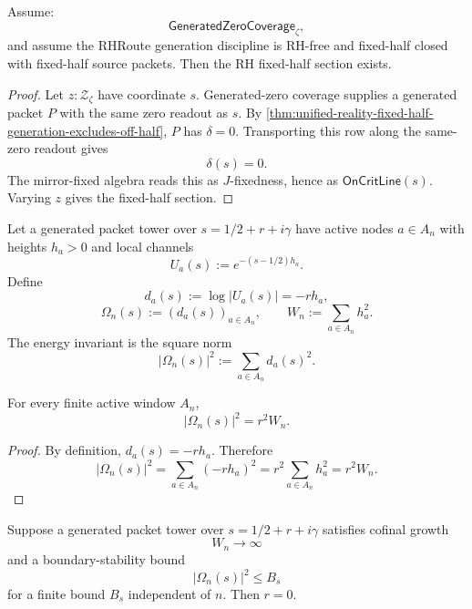 \begin{theorem}
\label{thm:unified-reality-generation-coverage-fixed-half-sufficient}
Assume:
$$
\mathsf{GeneratedZeroCoverage}_{\zeta},
$$
and assume the RHRoute generation discipline is RH-free and fixed-half
closed with fixed-half source packets.  Then the RH fixed-half section
exists.
\end{theorem}

\begin{proof}
Let $z:\mathcal Z_{\zeta}$ have coordinate $s$.  Generated-zero coverage
supplies a generated packet $P$ with the same zero readout as $s$.  By
\autoref{thm:unified-reality-fixed-half-generation-excludes-off-half},
$P$ has $\delta=0$.  Transporting this row along the same-zero readout
gives
$$
\delta(s)=0.
$$
The mirror-fixed algebra reads this as $J$-fixedness, hence as
$\mathsf{OnCritLine}(s)$.  Varying $z$ gives the fixed-half section.
\end{proof}

\begin{definition}
\label{def:unified-reality-energy-form-generation-invariant}
Let a generated packet tower over $s=1/2+r+i\gamma$ have active nodes
$a\in A_n$ with heights $h_a>0$ and local channels
$$
U_a(s)
:=
e^{-(s-1/2)h_a}.
$$
Define
$$
d_a(s):=\log|U_a(s)|=-r h_a,
$$
$$
\Omega_n(s):=(d_a(s))_{a\in A_n},
\qquad
W_n:=\sum_{a\in A_n}h_a^2.
$$
The energy invariant is the square norm
$$
\left|\Omega_n(s)\right|^2
:=
\sum_{a\in A_n}d_a(s)^2.
$$
\end{definition}

\begin{lemma}
\label{lem:unified-reality-energy-reads-normal-coordinate-generation}
For every finite active window $A_n$,
$$
\left|\Omega_n(s)\right|^2=r^2W_n.
$$
\end{lemma}

\begin{proof}
By definition, $d_a(s)=-rh_a$.  Therefore
$$
\left|\Omega_n(s)\right|^2
=
\sum_{a\in A_n}(-rh_a)^2
=
r^2\sum_{a\in A_n}h_a^2
=
r^2W_n.
$$
\end{proof}

\begin{theorem}
\label{thm:unified-reality-energy-bounded-generation-excludes-off-half}
Suppose a generated packet tower over $s=1/2+r+i\gamma$ satisfies
cofinal growth
$$
W_n\to\infty
$$
and a boundary-stability bound
$$
\left|\Omega_n(s)\right|^2\le B_s
$$
for a finite bound $B_s$ independent of $n$.  Then $r=0$.
\end{theorem}


